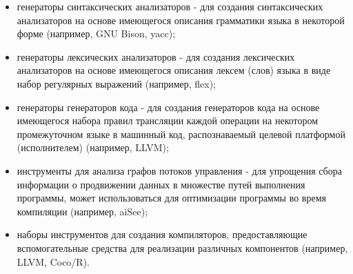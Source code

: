 \begin{itemize}
    \item генераторы синтаксических анализаторов - для создания синтаксических анализаторов на основе имеющегося описания грамматики языка в некоторой форме (например, GNU Bison, yacc);
    \item генераторы лексических анализаторов - для создания лексических анализаторов на основе имеющегося описания лексем (слов) языка в виде набор регулярных выражений (например, flex);
    \item генераторы генераторов кода - для создания генераторов кода на основе имеющегося набора правил трансляции каждой операции на некотором промежуточном языке в машинный код, распознаваемый целевой платформой (исполнителем) (например, LLVM);
    \item инструменты для анализа графов потоков управления - для упрощения сбора информации о продвижении данных в множестве путей выполнения программы, может использоваться для оптимизации программы во время компиляции (например, aiSee);
    \item наборы инструментов для создания компиляторов, предоставляющие вспомогательные средства для реализации различных компонентов (например, LLVM, Coco/R).
\end{itemize}
